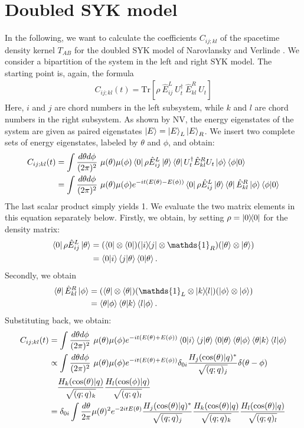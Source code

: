 \documentclass[12pt]{scrarticle}
\begin{document}
\section{Doubled SYK model}
In the following, we want to calculate the coefficients $C_{ij;kl}$ of the spacetime density kernel $T_{AB}$ for the doubled SYK model of Narovlansky and Verlinde \cite{Narovlansky2023}. We consider a bipartition of the system in the left and right SYK model. The starting point is, again, the formula
\begin{align}
    C_{ij; kl}(t) = \text{Tr} \left[ \rho \ \hat{E}_{ij}^L \ U_t^\dagger \ \hat{E}_{kl}^R \ U_t \right]
\end{align}
Here, $i$ and $j$ are chord numbers in the left subsystem, while $k$ and $l$ are chord numbers in the right subsystem. As shown by NV, the energy eigenstates of the system are given as paired eigenstates $\ket{E}=\ket{E}_L\ket{E}_R$. We insert two complete sets of energy eigenstates, labeled by $\theta$ and $\phi$, and obtain:
\begin{align}
    C_{ij;kl}(t) &= 
    \int \frac{d\theta d\phi}{(2\pi)^2} \ \mu(\theta) \mu(\phi) \bra{0}\rho \hat{E}_{ij}^L\ket{\theta} \bra{\theta}U_t^\dagger\hat{E}_{kl}^RU_t\ket{\phi}\braket{\phi|0}\\
    &= 
    \int \frac{d\theta d\phi}{(2\pi)^2} \ \mu(\theta) \mu(\phi) e^{-i t(E(\theta)-E(\phi))}\bra{0}\rho \hat{E}_{ij}^L\ket{\theta} \bra{\theta}\hat{E}_{kl}^R\ket{\phi}\braket{\phi|0}
\end{align}
The last scalar product simply yields 1. We evaluate the two matrix elements in this equation separately below. Firstly, we obtain, by setting $\rho=\ketbra{0}{0}$ for the density matrix:
\begin{align}
    \bra{0}\rho \hat{E}_{ij}^L\ket{\theta}&=(\bra{0}\otimes\bra{0})(\ketbra{i}{j} \otimes  \mathds{1}_R)(\ket{\theta}\otimes\ket{\theta})\\
    &=\braket{0|i}\braket{j|\theta}\braket{0|\theta}.
\end{align}
Secondly, we obtain 
\begin{align}
    \bra{\theta}\hat{E}_{kl}^R\ket{\phi}&=(\bra{\theta}\otimes\bra{\theta})( \mathds{1}_L\otimes \ketbra{k}{l})(\ket{\phi}\otimes\ket{\phi})\\
    &=\braket{\theta|\phi}\braket{\theta|k}\braket{l|\phi}.
\end{align}
Substituting back, we obtain:
\begin{align}
    C_{ij;kl}(t) &= \int \frac{d\theta d\phi}{(2\pi)^2} \ \mu(\theta) \mu(\phi) e^{-i t(E(\theta)+E(\phi))}\braket{0|i}\braket{j|\theta}\braket{0|\theta}\braket{\theta|\phi}\braket{\theta|k}\braket{l|\phi}\\
    &\propto\int \frac{d\theta d\phi}{(2\pi)^2} \ \mu(\theta) \mu(\phi) e^{-i t(E(\theta)+E(\phi))}\delta_{0i}\frac{H_j(\cos(\theta)|q)^*}{\sqrt{(q; q)_j}}\delta(\theta-\phi)\\
    &\quad\frac{H_k(\cos(\theta)|q)}{\sqrt{(q; q)_k}}\frac{H_l(\cos(\phi)|q)}{\sqrt{(q; q)_l}}\\
    &=\delta_{0i}\int \frac{d\theta}{2\pi}\mu(\theta)^2e^{-2i tE(\theta)}\frac{H_j(\cos(\theta)|q)^*}{\sqrt{(q; q)_j}}\frac{H_k(\cos(\theta)|q)}{\sqrt{(q;q)_k}} \frac{H_l(\cos(\theta)|q)}{\sqrt{(q; q)_l}}
\end{align}
\end{document}
